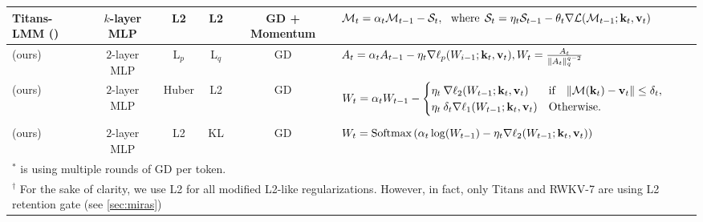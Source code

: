 \begin{table}[t!]
{\begin{tabular}{l c c c c c c}
         \multirow{1}{*}{Titans-LMM (\citeyear{behrouz2024titans})} & \multirow{1}{*}{$k$-layer MLP} & \multirow{1}{*}{L2} & \multirow{1}{*}{L2} & \multirow{1}{*}{GD + Momentum} & \multicolumn{2}{l}{$\mathcal{M}_t = \alpha_t \mathcal{M}_{t-1} - \mathcal{S}_t, \:\:\: \text{where} \:\: \mathcal{S}_t = \eta_t \mathcal{S}_{t-1} - \theta_t \nabla \mathcal{L}(\mathcal{M}_{t-1}; \mathbf{k}_t, \mathbf{v}_t)$}\\
         \midrule
       \mmodel{}  (\textcolor{c1}{ours}) & $2$-layer MLP & L$_p$ & L$_q$ & GD &  \multicolumn{2}{l}{$A_t = \alpha_t A_{t-1} - \eta_t \nabla \ell_p(W_{i-1};\mathbf{k}_t, \mathbf{v}_t), W_t = \frac{A_t}{\|A_t\|_q^{q-2}}$}\\
        \multirow{2}{*}{\ymodel{}  (\textcolor{c1}{ours})} & \multirow{2}{*}{$2$-layer MLP} & \multirow{2}{*}{Huber} & \multirow{2}{*}{L2} & \multirow{2}{*}{GD} &  \multicolumn{2}{l}{\multirow{2}{*}{$ W_t = \alpha_t W_{t-1} - \begin{cases} 
    \eta_t \: \nabla \ell_2 (W_{t-1}; \mathbf{k}_t, \mathbf{v}_t)   &  \text{if} \quad \| \mathcal{M}(\mathbf{k}_t) - \mathbf{v}_t \| \leq \delta_t, \\
    \eta_t \: \delta_t \nabla  \ell_1 (W_{t-1}; \mathbf{k}_t, \mathbf{v}_t)  & \text{Otherwise}.
    \end{cases} $}} \\
        &&&&&& \\
         &&&&&& \\
        \xmodel{}  (\textcolor{c1}{ours}) & $2$-layer MLP & L2 & KL & GD &  \multicolumn{2}{l}{$W_t = \mbox{Softmax}\left( \alpha_t \log(W_{t-1})  - \eta_t  \nabla \ell_2(W_{t-1};\mathbf{k}_t, \mathbf{v}_t)\right)$}\\
    \toprule
    \multicolumn{7}{l}{$^*$ is using multiple rounds of GD per token. }\\
     \multicolumn{7}{l}{$^\dagger$ For the sake of clarity, we use L2 for all modified L2-like regularizations. However, in fact, only Titans and RWKV-7 are using L2 retention gate (see \autoref{sec:miras})}
    \end{tabular}
    }
    \label{tab:memory-perspective-all}
\end{table}